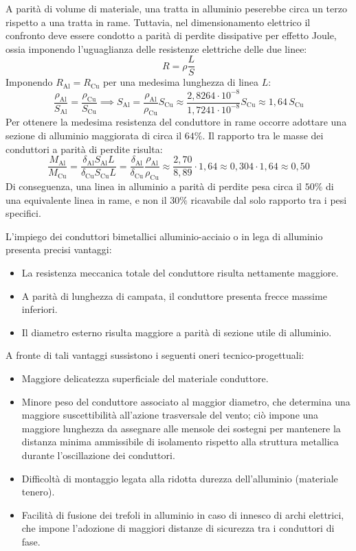 A parità di volume di materiale, una tratta in alluminio peserebbe circa un terzo rispetto a una tratta in rame. Tuttavia, nel dimensionamento elettrico il confronto deve essere condotto a parità di perdite dissipative per effetto Joule, ossia imponendo l'uguaglianza delle resistenze elettriche delle due linee:
\[R = \rho \frac{L}{S}\]
Imponendo $R_{\text{Al}} = R_{\text{Cu}}$ per una medesima lunghezza di linea $L$:
\[\frac{\rho_{\text{Al}}}{S_{\text{Al}}} = \frac{\rho_{\text{Cu}}}{S_{\text{Cu}}} \implies S_{\text{Al}} = \frac{\rho_{\text{Al}}}{\rho_{\text{Cu}}} S_{\text{Cu}} \approx \frac{2{,}8264 \cdot 10^{-8}}{1{,}7241 \cdot 10^{-8}} S_{\text{Cu}} \approx 1{,}64 \, S_{\text{Cu}}\]
Per ottenere la medesima resistenza del conduttore in rame occorre adottare una sezione di alluminio maggiorata di circa il $64\%$. Il rapporto tra le masse dei conduttori a parità di perdite risulta:
\[\frac{M_{\text{Al}}}{M_{\text{Cu}}} = \frac{\delta_{\text{Al}} S_{\text{Al}} L}{\delta_{\text{Cu}} S_{\text{Cu}} L} = \frac{\delta_{\text{Al}}}{\delta_{\text{Cu}}} \frac{\rho_{\text{Al}}}{\rho_{\text{Cu}}} \approx \frac{2{,}70}{8{,}89} \cdot 1{,}64 \approx 0{,}304 \cdot 1{,}64 \approx 0{,}50\]
Di conseguenza, una linea in alluminio a parità di perdite pesa circa il $50\%$ di una equivalente linea in rame, e non il $30\%$ ricavabile dal solo rapporto tra i pesi specifici.

L'impiego dei conduttori bimetallici alluminio-acciaio o in lega di alluminio presenta precisi vantaggi:
\begin{itemize}
    \item La resistenza meccanica totale del conduttore risulta nettamente maggiore.
    \item A parità di lunghezza di campata, il conduttore presenta frecce massime inferiori.
    \item Il diametro esterno risulta maggiore a parità di sezione utile di alluminio.
\end{itemize}

A fronte di tali vantaggi sussistono i seguenti oneri tecnico-progettuali:
\begin{itemize}
    \item Maggiore delicatezza superficiale del materiale conduttore.
    \item Minore peso del conduttore associato al maggior diametro, che determina una maggiore suscettibilità all'azione trasversale del vento; ciò impone una maggiore lunghezza da assegnare alle mensole dei sostegni per mantenere la distanza minima ammissibile di isolamento rispetto alla struttura metallica durante l'oscillazione dei conduttori.
    \item Difficoltà di montaggio legata alla ridotta durezza dell'alluminio (materiale tenero).
    \item Facilità di fusione dei trefoli in alluminio in caso di innesco di archi elettrici, che impone l'adozione di maggiori distanze di sicurezza tra i conduttori di fase.
\end{itemize}

